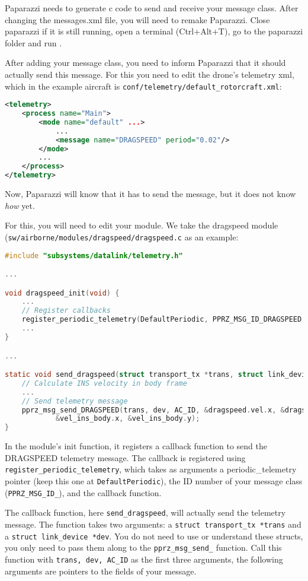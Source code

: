 \documentclass{article}
\begin{document}
Paparazzi needs to generate c code to send and receive your message class. After changing the messages.xml file, you will need to remake Paparazzi. Close paparazzi if it is still running, open a terminal (Ctrl+Alt+T), go to the paparazzi folder  and run .

After adding your message class, you need to inform Paparazzi that it should actually send this message. For this you need to edit the drone's telemetry xml, which in the example aircraft is \texttt{conf/telemetry/default\_rotorcraft.xml}:
\begin{lstlisting}[language=xml]
<telemetry>
	<process name="Main">
		<mode name="default" ...>
			...
			<message name="DRAGSPEED" period="0.02"/>
		</mode>
		...
	</process>
</telemetry>
\end{lstlisting}
Now, Paparazzi will know that it has to send the message, but it does not know \emph{how} yet.

For this, you will need to edit your module. We take the dragspeed module (\texttt{sw/airborne/modules/dragspeed/dragspeed.c} as an example:
\begin{lstlisting}[language=c]
#include "subsystems/datalink/telemetry.h"

...

void dragspeed_init(void) {
	...
	// Register callbacks
	register_periodic_telemetry(DefaultPeriodic, PPRZ_MSG_ID_DRAGSPEED, send_dragspeed);
	...
}

...

static void send_dragspeed(struct transport_tx *trans, struct link_device *dev) {
	// Calculate INS velocity in body frame
	...
	// Send telemetry message
	pprz_msg_send_DRAGSPEED(trans, dev, AC_ID, &dragspeed.vel.x, &dragspeed.vel.y,
			&vel_ins_body.x, &vel_ins_body.y);
}
\end{lstlisting}
In the module's init function, it registers a callback function to send the DRAGSPEED telemetry message. The callback is registered using \texttt{register\_periodic\_telemetry}, which takes as arguments a periodic\_telemetry pointer (keep this one at \texttt{DefaultPeriodic}), the ID number of your message class (\texttt{PPRZ\_MSG\_ID\_<YOUR MESSAGE NAME>}), and the callback function.

The callback function, here \texttt{send\_dragspeed}, will actually send the telemetry message. The function takes two arguments: a \texttt{struct transport\_tx *trans} and a \texttt{struct link\_device *dev}. You do not need to use or understand these structs, you only need to pass them along to the \texttt{pprz\_msg\_send\_<YOUR MESSAGE NAME>} function. Call this function with \texttt{trans, dev, AC\_ID} as the first three arguments, the following arguments are pointers to the fields of your message.
\end{document}
